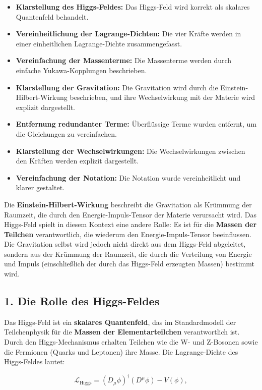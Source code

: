 \documentclass{article}
\begin{document}
\begin{itemize}
	\item \textbf{Klarstellung des Higgs-Feldes:} Das Higgs-Feld wird korrekt als skalares Quantenfeld behandelt.
	\item \textbf{Vereinheitlichung der Lagrange-Dichten:} Die vier Kräfte werden in einer einheitlichen Lagrange-Dichte zusammengefasst.
	\item \textbf{Vereinfachung der Massenterme:} Die Massenterme werden durch einfache Yukawa-Kopplungen beschrieben.
	\item \textbf{Klarstellung der Gravitation:} Die Gravitation wird durch die Einstein-Hilbert-Wirkung beschrieben, und ihre Wechselwirkung mit der Materie wird explizit dargestellt.
	\item \textbf{Entfernung redundanter Terme:} Überflüssige Terme wurden entfernt, um die Gleichungen zu vereinfachen.
	\item \textbf{Klarstellung der Wechselwirkungen:} Die Wechselwirkungen zwischen den Kräften werden explizit dargestellt.
	\item \textbf{Vereinfachung der Notation:} Die Notation wurde vereinheitlicht und klarer gestaltet.
\end{itemize}


Die \textbf{Einstein-Hilbert-Wirkung} beschreibt die Gravitation als Krümmung der Raumzeit, die durch den Energie-Impuls-Tensor der Materie verursacht wird. Das Higgs-Feld spielt in diesem Kontext eine andere Rolle: Es ist für die \textbf{Massen der Teilchen} verantwortlich, die wiederum den Energie-Impuls-Tensor beeinflussen. Die Gravitation selbst wird jedoch nicht direkt aus dem Higgs-Feld abgeleitet, sondern aus der Krümmung der Raumzeit, die durch die Verteilung von Energie und Impuls (einschließlich der durch das Higgs-Feld erzeugten Massen) bestimmt wird.

\subsection{1. Die Rolle des Higgs-Feldes}

Das Higgs-Feld ist ein \textbf{skalares Quantenfeld}, das im Standardmodell der Teilchenphysik für die \textbf{Massen der Elementarteilchen} verantwortlich ist. Durch den Higgs-Mechanismus erhalten Teilchen wie die W- und Z-Bosonen sowie die Fermionen (Quarks und Leptonen) ihre Masse. Die Lagrange-Dichte des Higgs-Feldes lautet:

\[
\mathcal{L}_\text{Higgs} = (D_\mu \phi)^\dagger (D^\mu \phi) - V(\phi),
\]
\end{document}
